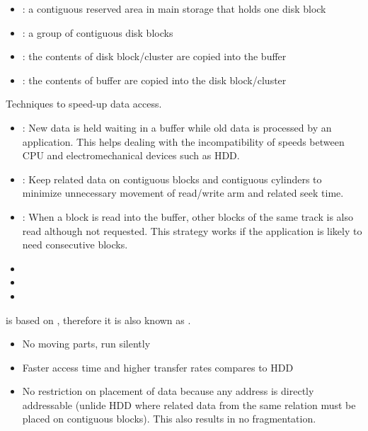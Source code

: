     \begin{itemize}
      \item {}: a contiguous reserved area in main storage that holds one disk block
      \item {}: a group of contiguous disk blocks
      \item {}: the contents of disk block/cluster are copied into the buffer
      \item {}: the contents of buffer are copied into the disk block/cluster
    \end{itemize}

    \par Techniques to speed-up data access.
    \begin{itemize}
      \item {}: New data is held waiting in a buffer while old data is processed by an application. This helps dealing with the incompatibility of speeds between CPU and electromechanical devices such as HDD.
      \item {}: Keep related data on contiguous blocks and contiguous cylinders to minimize unnecessary movement of read/write arm and related seek time.
      \item {}: When a block is read into the buffer, other blocks of the same track is also read although not requested. This strategy works if the application is likely to need consecutive blocks.
      \item {}
      \item {}
      \item {}
    \end{itemize}

    \par {} is based on , therefore it is also known as .
    \par {}
    \begin{itemize}
      \item No moving parts, run silently
      \item Faster access time and higher transfer rates compares to HDD
      \item No restriction on placement of data because any address is directly addressable (unlide HDD where related data from the same relation must be placed on contiguous blocks). This also results in no fragmentation.
    \end{itemize}

